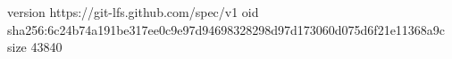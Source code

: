 version https://git-lfs.github.com/spec/v1
oid sha256:6c24b74a191be317ee0c9e97d94698328298d97d173060d075d6f21e11368a9c
size 43840
